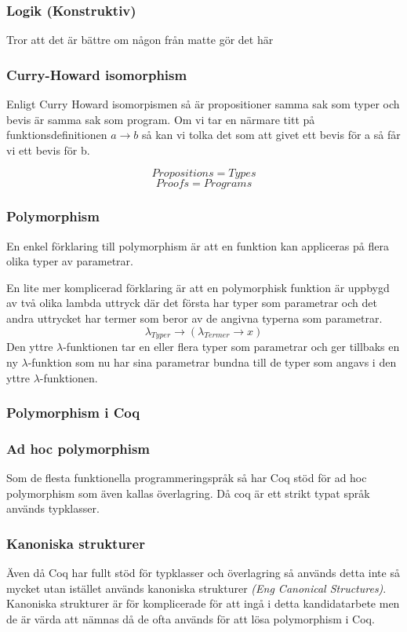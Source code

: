 \subsubsection{Logik (Konstruktiv)}
Tror att det är bättre om någon från matte gör det här

\subsubsection{Curry-Howard isomorphism}
Enligt Curry Howard isomorpismen så är propositioner samma sak som typer och
bevis är samma sak som program. Om vi tar en närmare titt på
funktionsdefinitionen $a \rightarrow b$ så kan vi tolka det som att givet ett
bevis för a så får vi ett bevis för b.

$$ Propositions = Types $$
$$ Proofs = Programs $$

\subsubsection{Polymorphism}
En enkel förklaring till polymorphism är att en funktion kan appliceras på
flera olika typer av parametrar.

En lite mer komplicerad förklaring är att en polymorphisk funktion är uppbygd
av två olika lambda uttryck där det första har typer som parametrar och det
andra uttrycket har termer som beror av de angivna typerna som parametrar.
\begin{equation}
  \lambda_{Typer} \rightarrow (\lambda_{Termer} \rightarrow x)
  \label{polymorphsk funktion}
\end{equation}
Den yttre $\lambda$-funktionen tar en eller flera typer som parametrar och ger
tillbaks en ny $\lambda$-funktion som nu har sina parametrar bundna till de
typer som angavs i den yttre $\lambda$-funktionen.

\subsubsection{Polymorphism i Coq}
\subsubsection{Ad hoc polymorphism}
Som de flesta funktionella programmeringspråk så har Coq stöd för ad hoc
polymorphism som även kallas överlagring. Då coq är ett strikt typat språk
används typklasser.

\subsubsection{Kanoniska strukturer}
Även då Coq har fullt stöd för typklasser och överlagring så används detta inte
så mycket utan istället används kanoniska strukturer {\it (Eng Canonical
Structures)}. Kanoniska strukturer är för komplicerade för att ingå i detta
kandidatarbete men de är värda att nämnas då de ofta används för att lösa
polymorphism i Coq.

